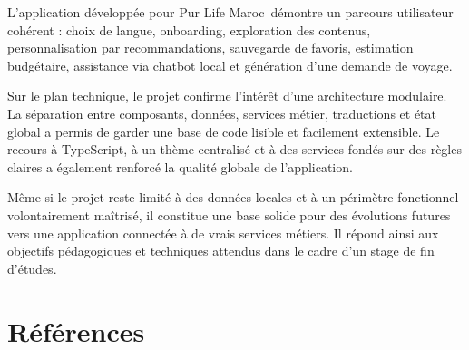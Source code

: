 \documentclass[12pt,a4paper]{report}
\newcommand{\ShortProjectName}{Pur Life Maroc}
\begin{document}
L'application développée pour \ShortProjectName\ démontre un parcours utilisateur cohérent : choix de langue, onboarding, exploration des contenus, personnalisation par recommandations, sauvegarde de favoris, estimation budgétaire, assistance via chatbot local et génération d'une demande de voyage.

Sur le plan technique, le projet confirme l'intérêt d'une architecture modulaire. La séparation entre composants, données, services métier, traductions et état global a permis de garder une base de code lisible et facilement extensible. Le recours à TypeScript, à un thème centralisé et à des services fondés sur des règles claires a également renforcé la qualité globale de l'application.

Même si le projet reste limité à des données locales et à un périmètre fonctionnel volontairement maîtrisé, il constitue une base solide pour des évolutions futures vers une application connectée à de vrais services métiers. Il répond ainsi aux objectifs pédagogiques et techniques attendus dans le cadre d'un stage de fin d'études.

\chapter*{Références}
\end{document}
